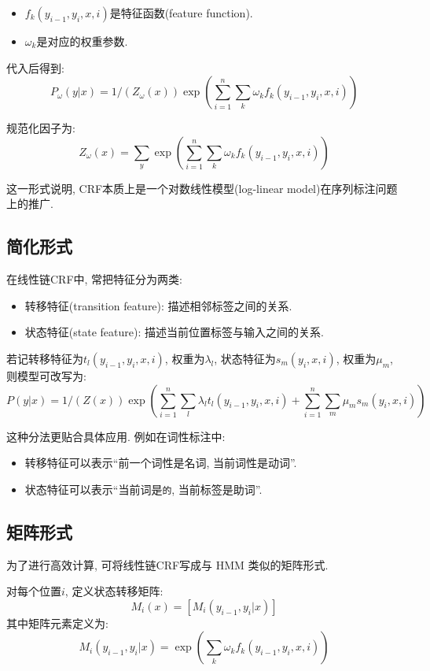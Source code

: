 \begin{itemize}
\item $f_k(y_{i-1}, y_i, x, i)$是特征函数(feature function).
\item $\omega_k$是对应的权重参数.
\end{itemize}

代入后得到:
\[
P_{\omega} (y|x)
    = 1/(Z_{\omega} (x))
      \exp(\sum_{i=1}^n \sum_k \omega_k f_k (y_{i-1}, y_i, x, i))
\]

规范化因子为:
\[
Z_{\omega} (x)
    = \sum_y
      \exp(\sum_{i=1}^n \sum_k \omega_k f_k (y_{i-1}, y_i, x, i))
\]

这一形式说明, CRF本质上是一个对数线性模型(log-linear model)在序列标注问题上的推广.

\subsection{简化形式}


在线性链CRF中, 常把特征分为两类:

\begin{itemize}
\item 转移特征(transition feature): 描述相邻标签之间的关系.
\item 状态特征(state feature): 描述当前位置标签与输入之间的关系.
\end{itemize}

若记转移特征为$t_l(y_{i-1}, y_i, x, i)$, 权重为$\lambda_l$,
状态特征为$s_m(y_i, x, i)$, 权重为$\mu_m$,
则模型可改写为:
\[
P(y|x)
    = 1/(Z(x))
      \exp(
        \sum_{i=1}^n \sum_l \lambda_l t_l (y_{i-1}, y_i, x, i)
        +
        \sum_{i=1}^n \sum_m \mu_m s_m (y_i, x, i)
      )
\]

这种分法更贴合具体应用.
例如在词性标注中:

\begin{itemize}
\item 转移特征可以表示“前一个词性是名词, 当前词性是动词”.
\item 状态特征可以表示“当前词是\texttt{的}, 当前标签是助词”.
\end{itemize}

\subsection{矩阵形式}


为了进行高效计算, 可将线性链CRF写成与 HMM 类似的矩阵形式.

对每个位置$i$, 定义状态转移矩阵:
\[
M_i (x) = [M_i (y_{i-1}, y_i | x)]
\]
其中矩阵元素定义为:
\[
M_i (y_{i-1}, y_i | x)
    = \exp(\sum_k \omega_k f_k (y_{i-1}, y_i, x, i))
\]

